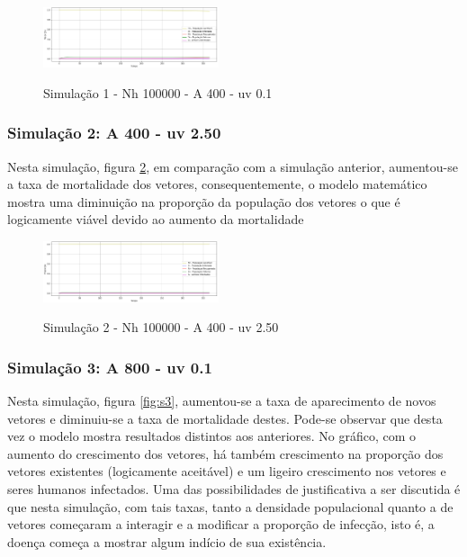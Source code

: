 \documentclass[conference]{IEEEtran}
\begin{document}
\begin{figure}[!ht]
  \caption{Simulação 1 - Nh 100000 - A 400 - uv 0.1}
  \includegraphics[width=0.46\textwidth]{Graf1.png}
  \label{fig:s1}
\end{figure}

\subsubsection{Simulação 2: A 400 - uv 2.50}

Nesta simulação, figura \ref{fig:s2}, em comparação com a simulação anterior, aumentou-se a taxa de mortalidade dos vetores, consequentemente, o modelo matemático mostra uma diminuição na proporção da população dos vetores o que é logicamente viável devido ao aumento da mortalidade
\\

\begin{figure}[!ht]
  \caption{Simulação 2 - Nh 100000 - A 400 - uv 2.50}
  \includegraphics[width=0.46\textwidth]{Graf2.png}
  \label{fig:s2}
\end{figure}

\subsubsection{Simulação 3: A 800 - uv 0.1}

Nesta simulação, figura \ref{fig:s3}, aumentou-se a taxa de aparecimento de novos vetores e diminuiu-se a taxa de mortalidade destes. Pode-se observar que desta vez o modelo mostra resultados distintos aos anteriores.  No gráfico, com o aumento do crescimento dos vetores, há também crescimento na proporção dos vetores existentes (logicamente aceitável) e um ligeiro crescimento nos vetores e seres humanos infectados. Uma das possibilidades de justificativa a ser discutida é que nesta simulação, com tais taxas, tanto a densidade populacional quanto a de vetores começaram a interagir e a modificar a proporção de infecção, isto é, a doença começa a mostrar algum indício de sua existência.
\\
\end{document}
